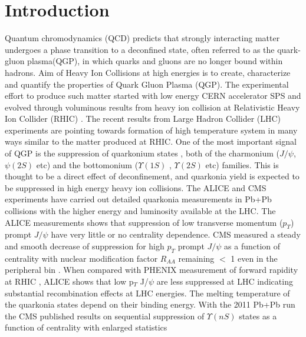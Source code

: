 \documentclass[aps,prc,preprint,superscriptaddress,showpacs,showkeys]{revtex4-1}
\begin{document}
\section{Introduction}
Quantum chromodynamics (QCD) predicts that strongly interacting matter undergoes a phase transition to a deconfined state, 
often referred to as the quark-gluon plasma(QGP), in which quarks and gluons are no longer bound within hadrons. Aim of Heavy 
Ion Collisions at high energies is to create, characterize and quantify the properties of Quark Gluon Plasma (QGP).  
 The experimental effort to produce such matter started with low energy CERN accelerator 
SPS and evolved through voluminous results from heavy ion collision at Relativistic Heavy Ion 
Collider (RHIC) \cite{INTRO}. The recent results from Large Hadron Collider (LHC) experiments \cite{QGP_Tc} are 
pointing towards formation of high temperature system in many ways similar to the matter
produced at RHIC. One of the most important signal of QGP is the suppression of 
quarkonium states \cite{SATZ}, both of the charmonium ($J/\psi$, $\psi(2S)$ etc) 
and the bottomonium ($\Upsilon(1S)$ , $\Upsilon(2S)$ etc) families. This is thought 
to be a direct effect of deconfinement, and quarkonia yield is expected to be suppressed
in high energy heavy ion collisions. 
 The ALICE and CMS experiments have carried out detailed quarkonia measurements in Pb+Pb collisions 
with the higher energy and luminosity available at the LHC. The ALICE measurements \cite{ALICEJPsi} shows that suppression of 
low transverse momentum ($p_T$) prompt $J/\psi$ have very little or no centrality dependence. CMS measured a steady and smooth decrease of 
suppression for high $p_T$ prompt $J/\psi$ as a function of centrality with nuclear modification factor $R_{AA}$ remaining $<$ 1 even 
in the peripheral bin \cite{JCMS,CMSJPsi}. When compared with PHENIX measurement of forward rapidity at RHIC \cite{PHENIXJPsi}, ALICE shows 
that low p$_T$ J/$\psi$ are less suppressed at LHC indicating substantial recombination effects at LHC energies.
The melting temperature of the quarkonia states depend on their binding energy. 
With the 2011 Pb+Pb run the CMS published results on sequential suppression of 
$\Upsilon(nS)$ states as a function of centrality \cite{CMSUpsilon} with enlarged statistics
\end{document}
